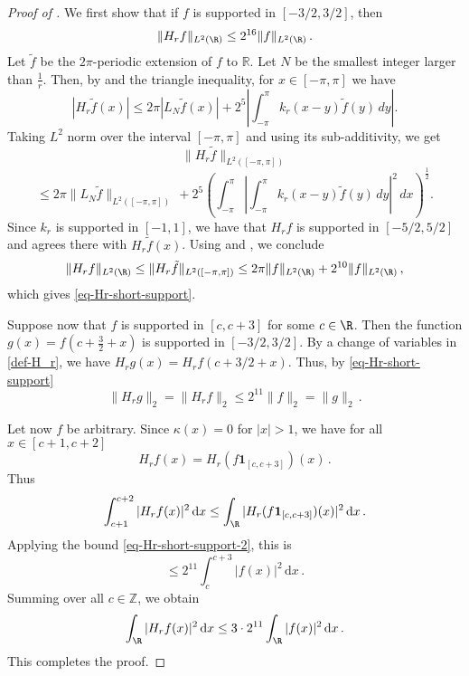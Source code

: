 \begin{proof}[Proof of ]
    We first show that if $f$ is supported in $[-3/2, 3/2]$, then
    \begin{equation}
        \label{eq-Hr-short-support}
        \|H_r f\|_{L^2(\R)} \le 2^{16} \|f\|_{L^2(\R)}\,.
    \end{equation}
    Let $\tilde{f}$ be the $2\pi$-periodic extension of $f$ to $\mathbb{R}$. Let $N$ be the smallest
    integer larger than $\frac 1r$. Then, by  and the triangle inequality, for $x\in [-\pi, \pi]$ we have
    \begin{equation*}
        |H_r \tilde{f}(x)|\leq 2\pi |L_N \tilde{f}(x)|+2^{5}\left|\int_{-\pi}^{\pi}k_r(x-y)\tilde{f}(y)\, dy\right|.
    \end{equation*}
    Taking $L^2$ norm over the interval $[-\pi, \pi]$ and using its sub-additivity, we get
    $$
         \|H_r \tilde{f}\|_{L^2([-\pi, \pi])}
    $$
    \begin{equation*}
       \leq 2\pi \|L_N \tilde{f}\|_{L^2([-\pi, \pi])}\, + 2^{5}\left(\int_{-\pi}^{\pi} \left|\int_{-\pi}^{\pi}k_r(x-y)\tilde{f}(y)\, dy\right|^2\, dx\right)^{\frac{1}{2}}.
    \end{equation*}
    Since $k_r$ is supported in $[-1,1]$, we have that $H_rf$ is supported in $[-5/2, 5/2]$ and agrees there with $H_r \tilde f(x)$.
    Using  and , we conclude
    \begin{equation}
        \|H_r f\|_{L^2(\R)} \le \|H_r \tilde f\|_{L^2([-\pi, \pi])} \leq 2\pi \|f\|_{L^2(\R)} + 2^{10}\|f\|_{L^2(\R)}\,,
    \end{equation}
    which gives \eqref{eq-Hr-short-support}.

    Suppose now that $f$ is supported in $[c, c+3]$ for some $c \in \R$. Then the function $g(x) = f(c+ \frac{3}{2} +x)$ is supported in $[-3/2,3/2]$. By a change of variables in \eqref{def-H_r}, we have $H_r g(x ) = H_r f(c+ 3/2+x)$. Thus, by \eqref{eq-Hr-short-support}
    \begin{equation}
        \label{eq-Hr-short-support-2}
        \|H_rg\|_2 = \|H_r f\|_2 \le 2^{11} \|f\|_2 = \|g\|_2\,.
    \end{equation}

    Let now $f$ be arbitrary.
    Since $\kappa(x) = 0$ for $|x| > 1$, we have for all $x \in [c+1, c+2]$
    $$
        H_rf(x) = H_r(f \mathbf{1}_{[c, c+3]})(x)\,.
    $$
    Thus
    $$
        \int_{c+1}^{c+2} |H_r f(x)|^2 \, \mathrm{d}x \le \int_{\R} |H_r(f \mathbf{1}_{[c, c+3]})(x)|^2 \, \mathrm{d}x\,.
    $$
    Applying the bound \eqref{eq-Hr-short-support-2}, this is
    $$
        \le 2^{11} \int_{c}^{c+3} |f(x)|^2 \, \mathrm{d}x\,.
    $$
    Summing over all $c \in \mathbb{Z}$, we obtain
    $$
        \int_{\R} |H_rf(x)|^2 \, \mathrm{d}x \le 3 \cdot 2^{11} \int_{\R} |f(x)|^2 \, \mathrm{d}x\,.
    $$
    This completes the proof.
\end{proof}







